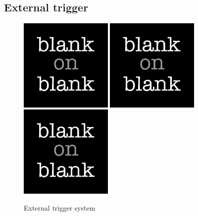 \subsection{External trigger}
\begin{figure}[!ht]
  \centering
  \includegraphics[width=0.4\textwidth]
  {blank.jpg}
  \includegraphics[width=0.4\textwidth]
  {blank.jpg}
  \includegraphics[width=0.4\textwidth]
  {blank.jpg}
  \caption{External trigger system}
  \label{fig: gas detector external trigger}
\end{figure}

